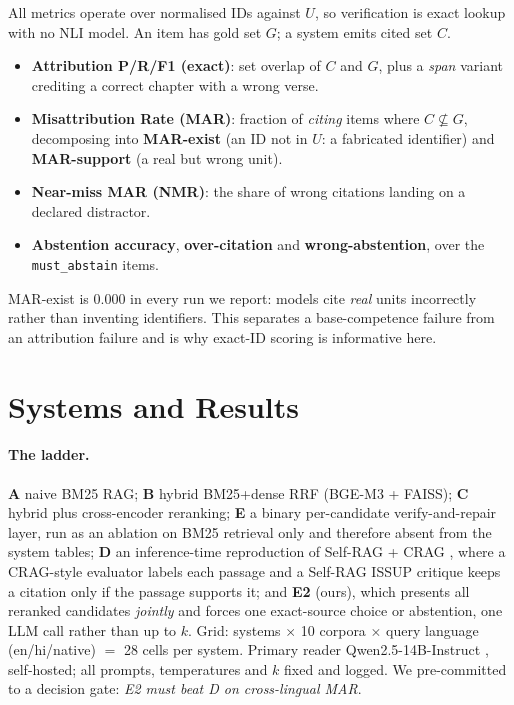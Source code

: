 \documentclass[11pt]{article}
\begin{document}
All metrics operate over normalised IDs against $U$, so verification is exact
lookup with no NLI model. An item has gold set $G$; a system emits cited set
$C$.

\begin{itemize}[noitemsep,topsep=2pt]
\item \textbf{Attribution P/R/F1 (exact)}: set overlap of $C$ and $G$, plus a
\emph{span} variant crediting a correct chapter with a wrong verse.
\item \textbf{Misattribution Rate (MAR)}: fraction of \emph{citing} items where
$C \not\subseteq G$, decomposing into \textbf{MAR-exist} (an ID not in $U$: a
fabricated identifier) and \textbf{MAR-support} (a real but wrong unit).
\item \textbf{Near-miss MAR (NMR)}: the share of wrong citations landing on a
declared distractor.
\item \textbf{Abstention accuracy}, \textbf{over-citation} and
\textbf{wrong-abstention}, over the \texttt{must\_abstain} items.
\end{itemize}

MAR-exist is 0.000 in every run we report: models cite \emph{real} units
incorrectly rather than inventing identifiers. This separates a base-competence
failure from an attribution failure and is why exact-ID scoring is informative
here.

\section{Systems and Results}
\label{sec:results}

\paragraph{The ladder.} \textbf{A} naive BM25 RAG; \textbf{B} hybrid BM25+dense
RRF (BGE-M3 \cite{chen2024bgem3} + FAISS); \textbf{C} hybrid plus cross-encoder
reranking; \textbf{E} a binary per-candidate verify-and-repair layer, run as an ablation on
BM25 retrieval only and therefore absent from the system tables;
\textbf{D} an inference-time reproduction of Self-RAG
\cite{asai2024selfrag} + CRAG \cite{yan2024crag}, where a CRAG-style evaluator
labels each passage and a Self-RAG ISSUP critique keeps a citation only if the
passage supports it; and \textbf{E2} (ours), which presents all reranked
candidates \emph{jointly} and forces one exact-source choice or abstention, one
LLM call rather than up to $k$. Grid: systems $\times$ 10 corpora $\times$ query
language (en/hi/native) $=$ 28 cells per system. Primary reader
Qwen2.5-14B-Instruct \cite{qwen2024}, self-hosted; all prompts, temperatures and
$k$ fixed and logged. We pre-committed to a decision gate: \emph{E2 must beat D
on cross-lingual MAR}.
\end{document}
